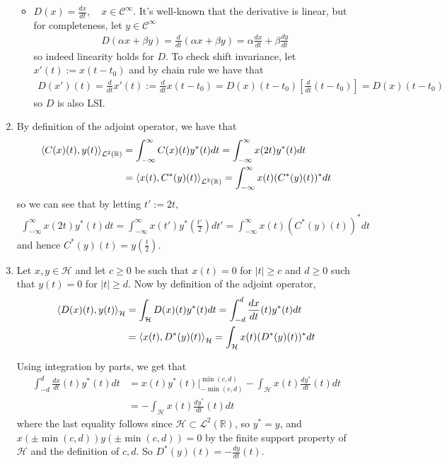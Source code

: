 \documentclass{article}
\makeatletter
\newcommand{\skipitems}[1]{%
  \addtocounter{\@enumctr}{#1}%
}
\makeatother
\begin{document}
\begin{enumerate}[label=(\roman*)]
\begin{itemize}
            \item $D(x)=\frac{dx}{dt},\quad x\in \mathcal{C}^\infty$. It's well-known that the derivative is linear, but for completeness, let $y\in \mathcal{C}^\infty$
            \begin{align}
                D(\alpha x + \beta y) = \frac{d}{dt}(\alpha x + \beta y) = \alpha \frac{dx}{dt} + \beta \frac{dy}{dt}
            \end{align}
            so indeed linearity holds for $D$. To check shift invariance, let $x'(t):=x(t-t_0)$ and by chain rule we have that
            \begin{align}
                D(x')(t)=\frac{d}{dt}x'(t) := \frac{d}{dt}x(t-t_0) =  D(x)(t-t_0) \left[\frac{d}{dt}(t-t_0)\right] =  D(x)(t-t_0)
            \end{align}
            so $D$ is also LSI.
        \end{itemize}
        
        \skipitems{1}
        \item By definition of the adjoint operator, we have that
        \begin{align}
            \left\langle C(x)(t),y(t) \right\rangle_{\mathcal{L}^2(\mathbb{R})} &= \int_{-\infty}^{\infty} C(x)(t)y^*(t) dt = \int_{-\infty}^{\infty} x(2t) y^*(t) dt \\
            &= \left\langle x(t),C^*(y)(t) \right\rangle_{\mathcal{L}^2(\mathbb{R})} = \int_{-\infty}^{\infty} x(t) (C^*(y)(t))^* dt
        \end{align}
        so we can see that by letting $t':=2t$,
        \begin{align}
            \int_{-\infty}^{\infty} x(2t) y^*(t) dt = \int_{-\infty}^{\infty} x(t') y^*\left(\frac{t'}{2}\right) dt'= \int_{-\infty}^{\infty} x(t) (C^*(y)(t))^* dt
        \end{align}
        and hence $C^*(y)(t)=y\left(\frac{t}{2}\right)$.
        \item Let $x,y\in \mathcal{H}$ and let $c\geq 0$ be such that $x(t)=0$ for $|t|\geq c$ and $d\geq 0$ such that $y(t)=0$ for $|t|\geq d$. Now by definition of the adjoint operator,
        \begin{align}
            \left\langle D(x)(t),y(t) \right\rangle_{\mathcal{H}} &= \int_{\mathcal{H}} D(x)(t)y^*(t) dt = \int_{-d }^{d} \frac{dx}{dt}(t) y^*(t) dt \\
            &= \left\langle x(t),D^*(y)(t) \right\rangle_{\mathcal{H}} = \int_{\mathcal{H}} x(t) (D^*(y)(t))^* dt
        \end{align}
        
        Using integration by parts, we get that
        \begin{align}
            \int_{-d }^{d} \frac{dx}{dt}(t) y^*(t) dt &=  x(t) y^*(t) \big\rvert_{-\min(c,d)}^{\min(c,d)} -  \int_{\mathcal{H}} x(t) \frac{dy^*}{dt}(t) dt \\
            &= -  \int_{\mathcal{H}} x(t) \frac{dy^*}{dt}(t) dt
        \end{align}
        where the last equality follows since $\mathcal{H}\subset \mathcal{L}^2(\mathbb{R})$, so $y^* = y$, and $x(\pm \min(c,d))y(\pm \min(c,d))=0$ by the finite support property of $\mathcal{H}$ and the definition of $c,d$. So $D^*(y)(t)=-\frac{dy}{dt}(t)$.
        

\end{enumerate}
\end{document}
